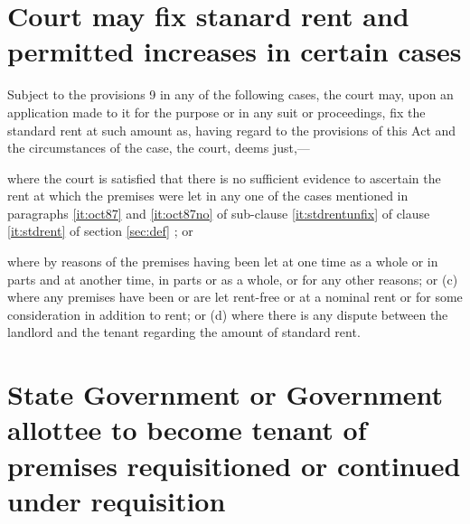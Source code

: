 \documentclass{mhact}
\begin{document}
\section{Court may fix stanard rent and permitted increases in certain
  cases}
\label{sec:courtfix}
\begin{subsectionlist}
\item Subject to the provisions 9 in any of the following cases, the
  court may, upon an application made to it for the purpose or in any
  suit or proceedings, fix the standard rent at such amount as, having
  regard to the provisions of this Act and the circumstances of the
  case, the court, deems just,---
  \begin{clause}
  \item where the court is satisfied that there is no sufficient
    evidence to ascertain the rent at which the premises were let in
    any one of the cases mentioned in paragraphs \ref{it:oct87} and
    \ref{it:oct87no} of
    sub-clause \ref{it:stdrentunfix} of clause \ref{it:stdrent} of section
    \ref{sec:def} ; or
    \item  where by
    reasons of the premises having been let at one time as a whole or
    in parts and at another time, in parts or as a whole, or for any
    other reasons; or (c) where any premises have been or are let
    rent-free or at a nominal rent or for some consideration in
    addition to rent; or (d) where there is any dispute between the
    landlord and the tenant regarding the amount of standard rent.
  \end{clause}
\end{subsectionlist}

\section{State Government or Government allottee to become tenant of
  premises requisitioned or continued under requisition}
\end{document}
